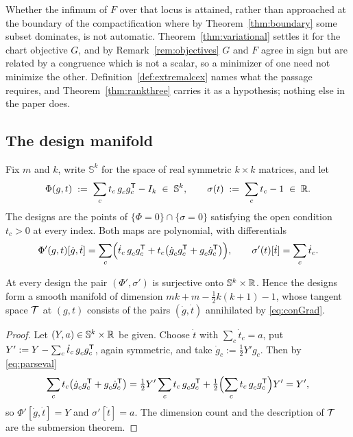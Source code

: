 Whether the infimum of $F$ over that locus is attained, rather than
approached at the boundary of the compactification where by
Theorem~\ref{thm:boundary} some subset dominates, is not automatic.
Theorem~\ref{thm:variational} settles it for the chart objective $G$, and
by Remark~\ref{rem:objectives} $G$ and $F$ agree in sign but are related
by a congruence which is not a scalar, so a minimizer of one need not
minimize the other.  Definition~\ref{def:extremalcex} names what the
passage requires, and Theorem~\ref{thm:rankthree} carries it as a
hypothesis; nothing else in the paper does.

\subsection{The design manifold}\label{sec:manifold}

Fix $m$ and $k$, write $\mathbb{S}^k$ for the space of real symmetric
$k\times k$ matrices, and let
\[
  \Phi(g,t)\;:=\;\sum_{c}t_c\,g_c^{\vphantom{\mathsf{T}}}g_c\tp-I_k
  \;\in\;\mathbb{S}^{k},
  \qquad
  \sigma(t)\;:=\;\sum_c t_c-1\;\in\;\R .
\]
The designs are the points of $\{\Phi=0\}\cap\{\sigma=0\}$ satisfying the
open condition $t_c>0$ at every index.  Both maps are polynomial, with
differentials
\begin{equation}\label{eq:conGrad}
  \Phi'(g,t)[\dot g,\dot t]
  =\sum_c\Bigl(\dot t_c\,g_c^{\vphantom{\mathsf{T}}}g_c\tp
      +t_c\bigl(\dot g_c^{\vphantom{\mathsf{T}}}g_c\tp
                +g_c^{\vphantom{\mathsf{T}}}\dot g_c\tp\bigr)\Bigr),
  \qquad
  \sigma'(t)[\dot t]=\sum_c\dot t_c .
\end{equation}

\begin{lemma}\label{lem:tangent}
At every design the pair $(\Phi',\sigma')$ is surjective onto
$\mathbb{S}^k\times\mathbb{R}$.  Hence the designs form a smooth manifold of
dimension $mk+m-\tfrac12k(k+1)-1$, whose tangent space $\mathcal{T}$ at $(g,t)$
consists of the pairs $(\dot g,\dot t)$ annihilated by
\eqref{eq:conGrad}.
\end{lemma}

\begin{proof}
Let $(Y,a)\in\mathbb{S}^k\times\mathbb{R}$ be given.  Choose $\dot t$ with
$\sum_c\dot t_c=a$, put
$Y':=Y-\sum_c\dot t_c\,g_c^{\vphantom{\mathsf{T}}}g_c\tp$, again
symmetric, and take
$\dot g_c:=\tfrac12Y'g_c$.  Then by \eqref{eq:parseval}
\[
  \sum_c t_c\bigl(\dot g_c^{\vphantom{\mathsf{T}}}g_c\tp
                 +g_c^{\vphantom{\mathsf{T}}}\dot g_c\tp\bigr)
  =\tfrac12Y'\sum_c t_c\,g_c^{\vphantom{\mathsf{T}}}g_c\tp
   +\tfrac12\Bigl(\sum_c t_c\,g_c^{\vphantom{\mathsf{T}}}g_c\tp\Bigr)Y'
  =Y' ,
\]
so $\Phi'[\dot g,\dot t]=Y$ and $\sigma'[\dot t]=a$.  The dimension count
and the description of $\mathcal{T}$ are the submersion theorem.
\end{proof}

